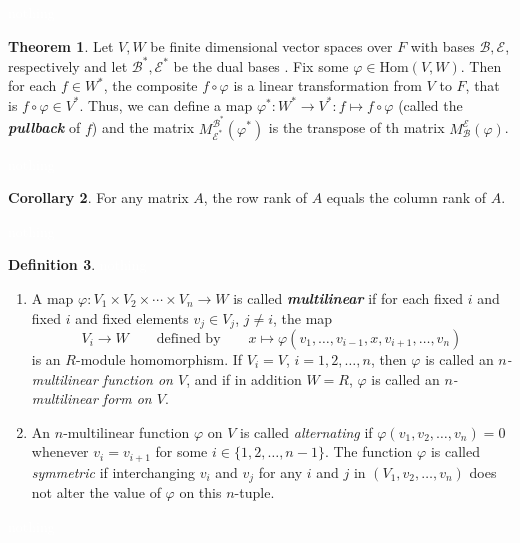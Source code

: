 \documentclass{article}
\theoremstyle{definition}
\newtheorem{thm}{Theorem}[section]
\newtheorem{cor}[thm]{Corollary}
\newtheorem{defn}[thm]{Definition}
\newcommand{\nl}{\textcolor{white}{nothing}}
\newcommand{\ra}{\rightarrow}
\newcommand{\vphi}{\varphi}
\newcommand{\Hom}{\text{Hom}}
\newcommand{\BB}{\mathcal{B}}
\newcommand{\EE}{\mathcal{E}}
\begin{document}
\nl

\begin{thm}
Let $V,W$ be finite dimensional vector spaces over $F$ with bases $\BB, \EE$, respectively and let $\BB^*,\EE^*$ be the dual bases . Fix some $\vphi\in \Hom(V,W)$. Then for each $f\in W^*$, the composite $f\circ \vphi$ is a linear transformation from $V$ to $F$, that is $f\circ \vphi\in V^*$. Thus, we can define a map $\vphi^*:W^* \ra V^*:f\mapsto f\circ \vphi$ (called the \textit{\textbf{pullback}} of $f$) and the matrix $M_{\EE^*}^{\BB^*}(\vphi^*)$ is the transpose of th matrix $M_\BB^\EE(\vphi)$.
\end{thm}

\nl

\begin{cor}
For any matrix $A$, the row rank of $A$ equals the column rank of $A$.
\end{cor}

\nl

\begin{defn}\nl
\begin{enumerate}
\item A map $\vphi:V_1\times V_2\times \cdots \times V_n\ra W$ is called \textit{\textbf{multilinear}} if for each fixed $i$ and fixed $i$ and fixed elements $v_j\in V_j$, $j\neq i$, the map
\[V_i \ra W\qquad \text{defined by}\qquad x\mapsto \vphi(v_1,\ldots,v_{i-1},x,v_{i+1},\ldots, v_n)\]
is an $R$-module homomorphism. If $V_i = V$, $i = 1,2,\ldots, n$, then $\vphi$ is called an $n$\textit{-multilinear function on $V$}, and if in addition $W = R$, $\vphi$ is called an \textit{$n$-multilinear form on $V$}.

\item An $n$-multilinear function $\vphi$ on $V$ is called \textit{alternating} if $\vphi(v_1, v_2,\ldots, v_n) = 0$ whenever $v_i = v_{i + 1}$ for some $i\in \{1,2,\ldots, n-1\}$. The function $\vphi$ is called \textit{symmetric} if interchanging $v_i$ and $v_j$ for any $i$ and $j$ in $(V_1,v_2,\ldots, v_n)$ does not alter the value of $\vphi$ on this $n$-tuple.
\end{enumerate}
\end{defn}

\nl
\end{document}
